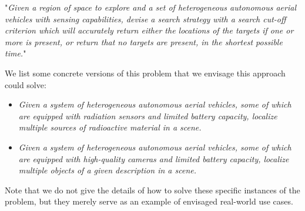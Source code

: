 "\textit{Given a region of space to explore and a set of heterogeneous autonomous aerial vehicles with sensing capabilities, devise a search strategy with a search cut-off criterion which will accurately return either the locations of the targets if one or more is present, or return that no targets are present, in the shortest possible time.}" \newline

We list some concrete versions of this problem that we envisage this approach could solve:
\begin{itemize}
    \item \textit{Given a system of heterogeneous autonomous aerial vehicles, some of which are equipped with radiation sensors and limited battery capacity, localize multiple sources of radioactive material in a scene.}
    \item \textit{Given a system of heterogeneous autonomous aerial vehicles, some of which are equipped with high-quality cameras and limited battery capacity, localize multiple objects of a given description in a scene.}
\end{itemize}
Note that we do not give the details of how to solve these specific instances of the problem, but they merely serve as an example of envisaged real-world use cases.
\par


